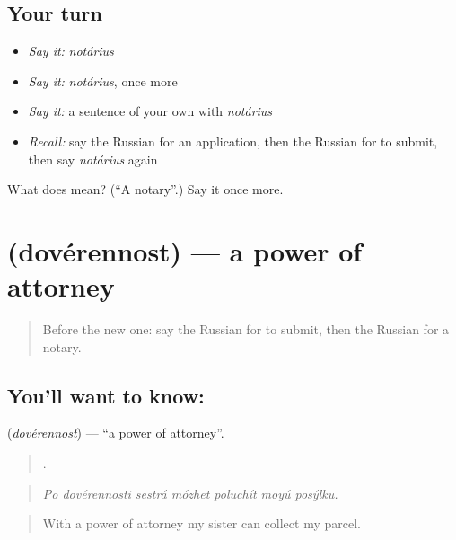 \subsection*{Your turn}
\begin{itemize}
\raggedright
  \item \emph{Say it:} \emph{notárius}
  \item \emph{Say it:} \emph{notárius}, once more
  \item \emph{Say it:} a sentence of your own with \emph{notárius}
  \item \emph{Recall:} say the Russian for an application, then the Russian for to submit, then say \emph{notárius} again
\end{itemize}

\begin{tcolorbox}[breakable,colback=teal!4,colframe=teal!35!black,title={Before you move on}]
What does  mean? (\textquotedblleft{}A notary\textquotedblright{}.) Say it once more.
\end{tcolorbox}
\section[\texorpdfstring{\ru{доверенность} (dovérennost)}{доверенность (dovérennost)}]{ (dovérennost) — a power of attorney}

\label{lesson:RU-C393-doverennost}



\begin{quote}
Before the new one: say the Russian for to submit, then the Russian for a notary.
\end{quote}

\subsection*{You'll want to know: }
\textbf{} (\emph{dovérennost}) — \textquotedblleft{}a power of attorney\textquotedblright{}.

\begin{quote}
      .
\end{quote}

\begin{quote}
\emph{Po dovérennosti sestrá mózhet poluchít moyú posýlku.}
\end{quote}

\begin{quote}
With a power of attorney my sister can collect my parcel.
\end{quote}


